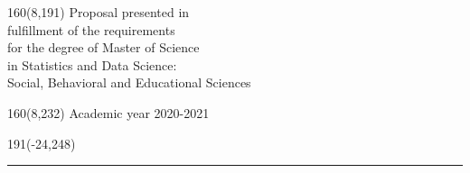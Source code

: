 \documentclass[12pt,a4paper,oneside]{article}
\begin{document}
%
\begin{textblock}{160}(8,191)
\textblockcolour{}
\vspace{-\parskip}
\flushright
Proposal presented in\\[4.5pt]
fulfillment of the requirements\\[4.5pt]
for the degree of Master of Science\\[4.5pt]
in Statistics and Data Science:\\[4.5pt]
Social, Behavioral and Educational Sciences
\end{textblock}
%
\begin{textblock}{160}(8,232)
\textblockcolour{}
\vspace{-\parskip}
\flushright
Academic year 2020-2021
\end{textblock}
%
\begin{textblock}{191}(-24,248)
{\color{blueline}\rule{550pt}{5.5pt}}
\end{textblock}
%
\vfill
\newpage
%
\rmfamily
\setcounter{page}{0}
%
\newpage
\setcounter{page}{0}
%

%
\newpage
\backmatter \singlespacing    %


\end{document}
